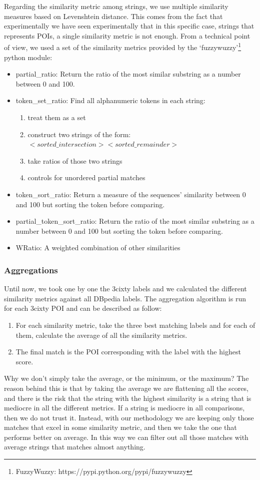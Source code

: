 \documentclass[paper=a4, fontsize=11pt]{scrartcl}
\begin{document}
Regarding the similarity metric among strings, we use multiple similarity measures based on Levenshtein distance. This comes from the fact that experimentally we have seen experimentally that in this specific case, strings that represents POIs, a single similarity metric is not enough. From a technical point of view, we used a set of the similarity metrics provided by the `fuzzywuzzy'\footnote{FuzzyWuzzy: https://pypi.python.org/pypi/fuzzywuzzy} python module:
\begin{itemize}
\item partial\_ratio: Return the ratio of the most similar substring
    as a number between 0 and 100.
\item token\_set\_ratio: Find all alphanumeric tokens in each string:
\begin{enumerate}
\item treat them as a set
\item construct two strings of the form: $<sorted\_intersection> <sorted\_remainder>$
\item take ratios of those two strings
\item controls for unordered partial matches
\end{enumerate}

\item token\_sort\_ratio: Return a measure of the sequences' similarity between 0 and 100
    but sorting the token before comparing.
\item partial\_token\_sort\_ratio: Return the ratio of the most similar substring as a number between 0 and 100 but sorting the token before comparing.

\item WRatio: A weighted combination of other similarities
\end{itemize}

\subsubsection{Aggregations}
Until now, we took one by one the 3cixty labels and we calculated the different similarity metrics against all DBpedia labels.
The aggregation algorithm is run for each 3cixty POI and can be described as follow:
\begin{enumerate}
\item For each similarity metric, take the three best matching labels and for each of them, calculate the average of all the similarity metrics.
\item The final match is the POI corresponding with the label with the highest score.
\end{enumerate}
Why we don't simply take the average, or the minimum, or the maximum?
The reason behind this is that by taking the average we are flattening all the scores, and there is the risk that the string with the highest similarity is a string that is mediocre in all the different metrics. If a string is mediocre in all comparisons, then we do not trust it. Instead, with our methodology we are keeping only those matches that excel in some similarity metric, and then we take the one that performs better on average. In this way we can filter out all those matches with average strings that matches almost anything.
\end{document}
